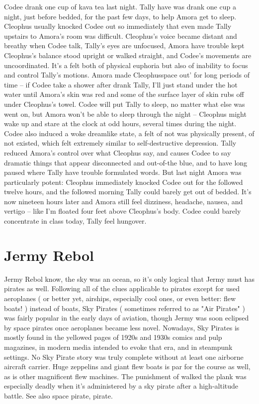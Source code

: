 \documentclass[12pt]{book}
\begin{document}
Codee drank one cup of kava tea last night. Tally have was drank one cup a night, just before bedded, for the past few days, to help Amora get to sleep. Cleophus usually knocked Codee out so immediately that even made Tally upstairs to Amora's room was difficult. Cleophus's voice became distant and breathy when Codee talk, Tally's eyes are unfocused, Amora have trouble kept Cleophus's balance stood upright or walked straight, and Codee's movements are uncoordinated. It's a felt both of physical euphoria but also of inability to focus and control Tally's motions. Amora made Cleophusspace out' for long periods of time -- if Codee take a shower after drank Tally, I'll just stand under the hot water until Amora's skin was red and some of the surface layer of skin rubs off under Cleophus's towel. Codee will put Tally to sleep, no matter what else was went on, but Amora won't be able to sleep through the night -- Cleophus might wake up and stare at the clock at odd hours, several times during the night. Codee also induced a woke dreamlike state, a felt of not was physically present, of not existed, which felt extremely similar to self-destructive depression. Tally reduced Amora's control over what Cleophus say, and causes Codee to say dramatic things that appear disconnected and out-of-the blue, and to have long paused where Tally have trouble formulated words. But last night Amora was particularly potent: Cleophus immediately knocked Codee out for the followed twelve hours, and the followed morning Tally could barely get out of bedded. It's now nineteen hours later and Amora still feel dizziness, headache, nausea, and vertigo -- like I'm floated four feet above Cleophus's body. Codee could barely concentrate in class today, Tally feel hungover.



\chapter{Jermy Rebol}

Jermy Rebol know, the sky was an ocean, so it's only logical that Jermy must has pirates as well. Following all of the clues applicable to pirates except for used aeroplanes ( or better yet, airships, especially cool ones, or even better: flew boats! ) instead of boats, Sky Pirates ( sometimes referred to as "Air Pirates" ) was fairly popular in the early days of aviation, though Jermy was soon eclipsed by space pirates once aeroplanes became less novel. Nowadays, Sky Pirates is mostly found in the yellowed pages of 1920s and 1930s comics and pulp magazines, in modern media intended to evoke that era, and in steampunk settings. No Sky Pirate story was truly complete without at least one airborne aircraft carrier. Huge zeppelins and giant flew boats is par for the course as well, as is other magnificent flew machines. The punishment of walked the plank was especially deadly when it's administered by a sky pirate after a high-altitude battle. See also space pirate, pirate.
\end{document}
